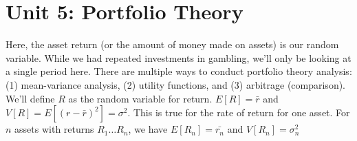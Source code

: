 \documentclass[11pt]{article}
\theoremstyle{definition}
\begin{document}
\section{Unit 5: Portfolio Theory}
Here, the asset return (or the amount of money made on assets) is our random variable. While we had repeated investments in gambling, we'll only be looking at a single period here. There are multiple ways to conduct portfolio theory analysis: (1) mean-variance analysis, (2) utility functions, and (3) arbitrage (comparison). \\

\noindent We'll define $R$ as the random variable for return. $E[R] = \bar{r}$ and $V[R] = E[(r - \bar{r})^2] = \sigma^2$. This is true for the rate of return for one asset. For $n$ assets with returns $R_1 \dots R_n$, we have $E[R_n] = \bar{r_n}$ and $V[R_n] = \sigma_n^2$
\newpage
\end{document}
